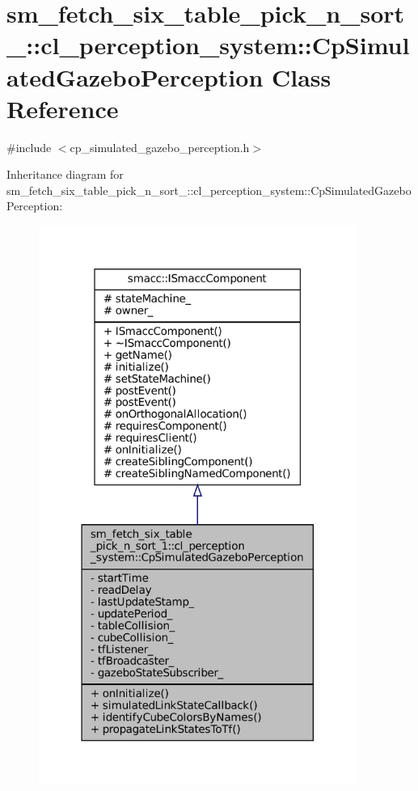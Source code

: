 \hypertarget{classsm__fetch__six__table__pick__n__sort__1_1_1cl__perception__system_1_1CpSimulatedGazeboPerception}{}\section{sm\+\_\+fetch\+\_\+six\+\_\+table\+\_\+pick\+\_\+n\+\_\+sort\+\_\+:\+:cl\+\_\+perception\+\_\+system\+:\+:Cp\+Simulated\+Gazebo\+Perception Class Reference}
\label{classsm__fetch__six__table__pick__n__sort__1_1_1cl__perception__system_1_1CpSimulatedGazeboPerception}


{\ttfamily \#include $<$cp\+\_\+simulated\+\_\+gazebo\+\_\+perception.\+h$>$}



Inheritance diagram for sm\+\_\+fetch\+\_\+six\+\_\+table\+\_\+pick\+\_\+n\+\_\+sort\+\_\+:\+:cl\+\_\+perception\+\_\+system\+:\+:Cp\+Simulated\+Gazebo\+Perception\+:
\nopagebreak
\begin{figure}[H]
\begin{center}
\leavevmode
\includegraphics[width=295pt]{classsm__fetch__six__table__pick__n__sort__1_1_1cl__perception__system_1_1CpSimulatedGazeboPerception__inherit__graph}
\end{center}
\end{figure}


